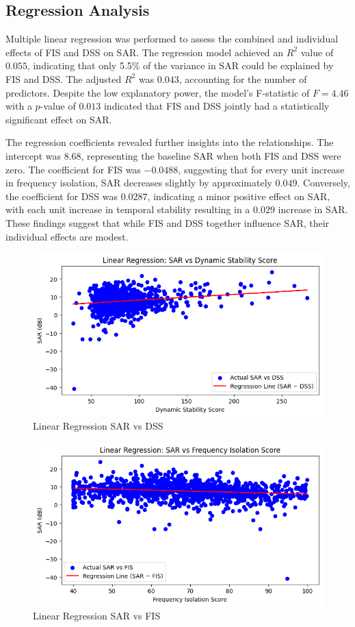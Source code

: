 \documentclass[10pt,twocolumn]{article}
\begin{document}
\subsection{Regression Analysis}
Multiple linear regression was performed to assess the combined and individual effects of FIS and DSS on SAR. The regression model achieved an $R^2$ value of $0.055$, indicating that only 5.5\% of the variance in SAR could be explained by FIS and DSS. The adjusted $R^2$ was $0.043$, accounting for the number of predictors. Despite the low explanatory power, the model’s F-statistic of $F = 4.46$ with a $p$-value of $0.013$ indicated that FIS and DSS jointly had a statistically significant effect on SAR.

The regression coefficients revealed further insights into the relationships. The intercept was $8.68$, representing the baseline SAR when both FIS and DSS were zero. The coefficient for FIS was $-0.0488$, suggesting that for every unit increase in frequency isolation, SAR decreases slightly by approximately $0.049$. Conversely, the coefficient for DSS was $0.0287$, indicating a minor positive effect on SAR, with each unit increase in temporal stability resulting in a $0.029$ increase in SAR. These findings suggest that while FIS and DSS together influence SAR, their individual effects are modest.
\begin{figure}
    \centering
    \includegraphics[width=.95\linewidth]{results graph/Linear Regression SAR vs DSS.png}
    \caption{
        Linear Regression SAR vs DSS
    }
    \label{fig:first-page}
\end{figure}
\begin{figure}
    \centering
    \includegraphics[width=.95\linewidth]{results graph/Linear regression SAR vs FIS.png}
    \caption{
        Linear Regression SAR vs FIS
    }
    \label{fig:first-page}
\end{figure}
\end{document}
